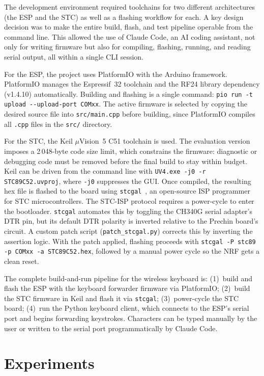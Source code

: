 \documentclass[12pt, a4paper]{article}
\begin{document}
The development environment required toolchains for two different architectures (the ESP and the STC) as well as a flashing workflow for each. A key design decision was to make the entire build, flash, and test pipeline operable from the command line. This allowed the use of Claude Code, an AI coding assistant, not only for writing firmware but also for compiling, flashing, running, and reading serial output, all within a single CLI session.

For the ESP, the project uses PlatformIO with the Arduino framework. PlatformIO manages the Espressif~32 toolchain and the RF24 library dependency (v1.4.10) automatically. Building and flashing is a single command: \texttt{pio run -t upload -{}-upload-port COMxx}. The active firmware is selected by copying the desired source file into \texttt{src/main.cpp} before building, since PlatformIO compiles all \texttt{.cpp} files in the \texttt{src/} directory.

For the STC, the Keil $\mu$Vision~5 C51 toolchain is used. The evaluation version imposes a 2\,048-byte code size limit, which constrains the firmware: diagnostic or debugging code must be removed before the final build to stay within budget. Keil can be driven from the command line with \texttt{UV4.exe -j0 -r STC89C52.uvproj}, where \texttt{-j0} suppresses the GUI. Once compiled, the resulting hex file is flashed to the board using \texttt{stcgal}~\cite{stcgal}, an open-source ISP programmer for STC microcontrollers. The STC-ISP protocol requires a power-cycle to enter the bootloader. \texttt{stcgal} automates this by toggling the CH340G serial adapter's DTR pin, but its default DTR polarity is inverted relative to the Prechin board's circuit. A custom patch script (\texttt{patch\_stcgal.py}) corrects this by inverting the assertion logic. With the patch applied, flashing proceeds with \texttt{stcgal -P stc89 -p COMxx -a STC89C52.hex}, followed by a manual power cycle so the NRF gets a clean reset.

The complete build-and-run pipeline for the wireless keyboard is: (1)~build and flash the ESP with the keyboard forwarder firmware via PlatformIO; (2)~build the STC firmware in Keil and flash it via \texttt{stcgal}; (3)~power-cycle the STC board; (4)~run the Python keyboard client, which connects to the ESP's serial port and begins forwarding keystrokes. Characters can be typed manually by the user or written to the serial port programmatically by Claude Code.

\section{Experiments}
\end{document}
